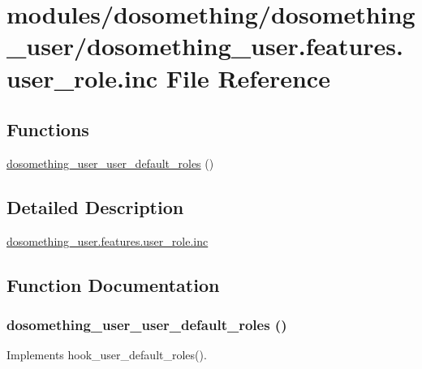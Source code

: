 \hypertarget{dosomething__user_8features_8user__role_8inc}{
\section{modules/dosomething/dosomething\_\-user/dosomething\_\-user.features.user\_\-role.inc File Reference}
\label{dosomething__user_8features_8user__role_8inc}
}
\subsection*{Functions}
\begin{DoxyCompactItemize}
\item 
\hyperlink{dosomething__user_8features_8user__role_8inc_a8526a8d6c1317255d83f4e9c71e094e9}{dosomething\_\-user\_\-user\_\-default\_\-roles} ()
\end{DoxyCompactItemize}


\subsection{Detailed Description}
\hyperlink{dosomething__user_8features_8user__role_8inc}{dosomething\_\-user.features.user\_\-role.inc} 

\subsection{Function Documentation}
\hypertarget{dosomething__user_8features_8user__role_8inc_a8526a8d6c1317255d83f4e9c71e094e9}{
\subsubsection[{dosomething\_\-user\_\-user\_\-default\_\-roles}]{\setlength{\rightskip}{0pt plus 5cm}dosomething\_\-user\_\-user\_\-default\_\-roles ()}}
\label{dosomething__user_8features_8user__role_8inc_a8526a8d6c1317255d83f4e9c71e094e9}
Implements hook\_\-user\_\-default\_\-roles(). 